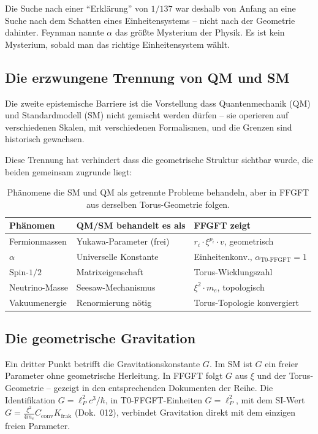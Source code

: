 Die Suche nach einer ``Erklärung'' von $1/137$ war deshalb von
Anfang an eine Suche nach dem Schatten eines Einheitensystems --
nicht nach der Geometrie dahinter. Feynman nannte $\alpha$ das
größte Mysterium der Physik. Es ist kein Mysterium, sobald man
das richtige Einheitensystem wählt.

\subsection{Die erzwungene Trennung von QM und SM}

Die zweite epistemische Barriere ist die Vorstellung dass
Quantenmechanik (QM) und Standardmodell (SM) nicht gemischt
werden dürfen -- sie operieren auf verschiedenen Skalen, mit
verschiedenen Formalismen, und die Grenzen sind historisch
gewachsen.

Diese Trennung hat verhindert dass die geometrische Struktur
sichtbar wurde, die beiden gemeinsam zugrunde liegt:

\begin{table}[htbp]
\centering\footnotesize
\begin{tabular}{lll}
\toprule
\textbf{Phänomen} & \textbf{QM/SM behandelt es als} & \textbf{FFGFT zeigt} \\
\midrule
Fermionmassen & Yukawa-Parameter (frei) & $r_i \cdot \xi^{p_i} \cdot v$, geometrisch \\
$\alpha$ & Universelle Konstante & Einheitenkonv., $\alpha_{\text{T0-FFGFT}}=1$ \\
Spin-$1/2$ & Matrixeigenschaft & Torus-Wicklungszahl \\
Neutrino-Masse & Seesaw-Mechanismus & $\xi^2 \cdot m_e$, topologisch \\
Vakuumenergie & Renormierung nötig & Torus-Topologie konvergiert \\
\bottomrule
\end{tabular}
\caption{Phänomene die SM und QM als getrennte Probleme behandeln,
aber in FFGFT aus derselben Torus-Geometrie folgen.}
\label{tab:sm_qm}
\end{table}

\subsection{Die geometrische Gravitation}

Ein dritter Punkt betrifft die Gravitationskonstante $G$.
Im SM ist $G$ ein freier Parameter ohne geometrische Herleitung.
In FFGFT folgt $G$ aus $\xi$ und der Torus-Geometrie -- gezeigt
in den entsprechenden Dokumenten der Reihe. Die Identifikation
$G = \ell_P^2 c^3/\hbar$, in T0-FFGFT-Einheiten $G = \ell_P^2$, mit dem SI-Wert $G = \frac{\xi^2}{4m_e}C_{\text{conv}}K_{\text{frak}}$ (Dok.~012),
verbindet Gravitation direkt
mit dem einzigen freien Parameter.


